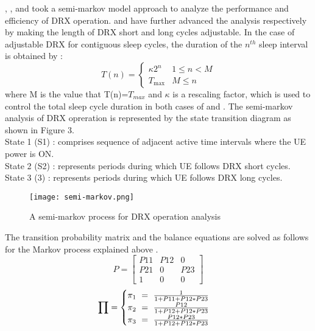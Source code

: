 \documentclass[8pt]{article}
\begin{document}
\cite{6363708}, \cite{1690890893}, \cite{7303883} and \cite{6654993} took a semi-markov model approach to analyze the performance and efficiency of DRX operation. \cite{6363708} and \cite{1690890893} have further advanced the analysis respectively by making the length of DRX short and long cycles adjustable. In the case of adjustable DRX for contiguous sleep cycles, the duration of the \(n^{th}\) sleep interval is obtained by :
\begin{equation*}
T(n)=\begin{cases} 
		\kappa 2^{n} & 1\leq {n}<{M}
		\\ 
		T_{\max} & {M}\leq {n}
	\end{cases}
\end{equation*}
where M is the value that T(n)=\(T_{max}\) and \(\kappa\) is a rescaling factor, which is used to control the total sleep cycle duration in both cases of \cite{6363708} and \cite{1690890893}. The semi-markov analysis of DRX opreration is represented by the state transition diagram as shown in Figure 3.
\\
State 1 (S1) : comprises sequence of adjacent active time intervals where the UE power is ON.
\\
State 2 (S2) : represents periods during which UE follows DRX short cycles.
\\
State 3 (3) :  represents periods during which UE follows DRX long cycles.
\begin{figure}[h!]
\texttt{[image: semi-markov.png]}
\caption{A semi-markov process for DRX operation analysis} 
\label{fig:DRX}
\end{figure}

The transition probability matrix and the balance equations are solved as follows for the Markov process explained above \cite{6363708}.
\begin{equation}
	{P}= \begin{bmatrix} 
				P11 & P12 & 0 \\ 
	            P21 & 0 & P23 \\ 
	            1 & 0 & 0
	     \end{bmatrix}
\end{equation}
\begin{equation}
	\prod=\begin{cases} \pi_{1}\ =\ {1 \over 1+P11+P12*P23}\cr \pi_{2}\ =\ {P12 \over 1+P12+P12*P23}\cr \pi_{3}\ =\ {P12*P23\over 1+P12+P12*P23} 
          \end{cases}	
\end{equation}
\end{document}
